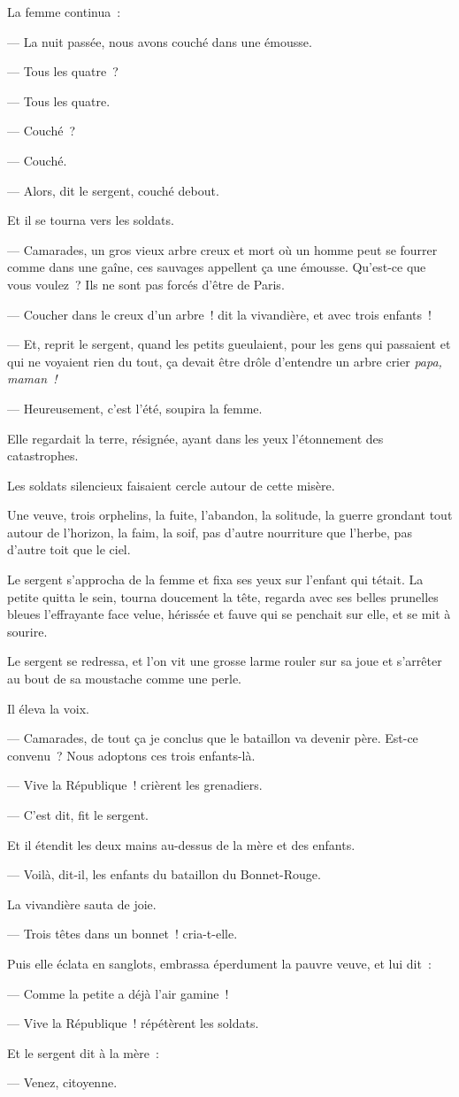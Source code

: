 \documentclass[french,twoside]{book} %
\begin{document}
La femme continua :\par
— La nuit passée, nous avons couché dans une émousse.\par
— Tous les quatre ?\par
— Tous les quatre.\par
— Couché ?\par
— Couché.\par
— Alors, dit le sergent, couché debout.\par
Et il se tourna vers les soldats.\par
— Camarades, un gros vieux arbre creux et mort où un homme peut se fourrer comme dans une gaîne, ces sauvages appellent ça une émousse. Qu’est-ce que vous voulez ? Ils ne sont pas forcés d’être de Paris.\par
— Coucher dans le creux d’un arbre ! dit la vivandière, et avec trois enfants !\par
— Et, reprit le sergent, quand les petits gueulaient, pour les gens qui passaient et qui ne voyaient rien du tout, ça devait être drôle d’entendre un arbre crier \emph{papa, maman !}\par
— Heureusement, c’est l’été, soupira la femme.\par
Elle regardait la terre, résignée, ayant dans les yeux l’étonnement des catastrophes.\par
Les soldats silencieux faisaient cercle autour de cette misère.\par
Une veuve, trois orphelins, la fuite, l’abandon, la solitude, la guerre grondant tout autour de l’horizon, la faim, la soif, pas d’autre nourriture que l’herbe, pas d’autre toit que le ciel.\par
Le sergent s’approcha de la femme et fixa ses  yeux sur l’enfant qui tétait. La petite quitta le sein, tourna doucement la tête, regarda avec ses belles prunelles bleues l’effrayante face velue, hérissée et fauve qui se penchait sur elle, et se mit à sourire.\par
Le sergent se redressa, et l’on vit une grosse larme rouler sur sa joue et s’arrêter au bout de sa moustache comme une perle.\par
Il éleva la voix.\par
— Camarades, de tout ça je conclus que le bataillon va devenir père. Est-ce convenu ? Nous adoptons ces trois enfants-là.\par
— Vive la République ! crièrent les grenadiers.\par
— C’est dit, fit le sergent.\par
Et il étendit les deux mains au-dessus de la mère et des enfants.\par
— Voilà, dit-il, les enfants du bataillon du Bonnet-Rouge.\par
La vivandière sauta de joie.\par
— Trois têtes dans un bonnet ! cria-t-elle.\par
Puis elle éclata en sanglots, embrassa éperdument la pauvre veuve, et lui dit :\par
— Comme la petite a déjà l’air gamine !\par
— Vive la République ! répétèrent les soldats.\par
Et le sergent dit à la mère :\par
— Venez, citoyenne.
\end{document}

